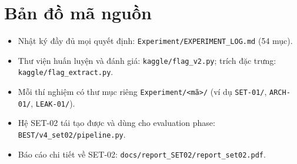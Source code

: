 \documentclass[11pt,a4paper,oneside]{report}
\newcommand{\id}[1]{\texttt{#1}}
\begin{document}
\section{Bản đồ mã nguồn}
\begin{itemize}
\item Nhật ký đầy đủ mọi quyết định: \id{Experiment/EXPERIMENT\_LOG.md} (54 mục).
\item Thư viện huấn luyện và đánh giá: \id{kaggle/flag\_v2.py}; trích đặc trưng: \id{kaggle/flag\_extract.py}.
\item Mỗi thí nghiệm có thư mục riêng \id{Experiment/<mã>/} (ví dụ \id{SET-01/}, \id{ARCH-01/}, \id{LEAK-01/}).
\item Hệ SET-02 tái tạo được và dùng cho evaluation phase: \id{BEST/v4\_set02/pipeline.py}.
\item Báo cáo chi tiết về SET-02: \id{docs/report\_SET02/report\_set02.pdf}.
\end{itemize}
\end{document}
